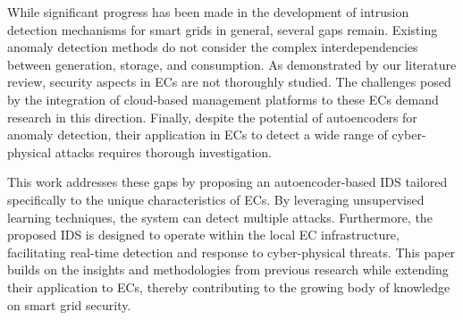 While significant progress has been made in the development of intrusion detection mechanisms for smart grids in general, several gaps remain. Existing anomaly detection methods do not consider the complex interdependencies between generation, storage, and consumption. As demonstrated by our literature review, security aspects in ECs are not thoroughly studied. The challenges posed by the integration of cloud-based management platforms to these ECs demand research in this direction. Finally, despite the potential of autoencoders for anomaly detection, their application in ECs to detect a wide range of cyber-physical attacks requires thorough investigation.

This work addresses these gaps by proposing an autoencoder-based IDS tailored specifically to the unique characteristics of ECs. By leveraging unsupervised learning techniques, the system can detect multiple attacks. Furthermore, the proposed IDS is designed to operate within the local EC infrastructure, facilitating real-time detection and response to cyber-physical threats. This paper builds on the insights and methodologies from previous research while extending their application to ECs, thereby contributing to the growing body of knowledge on smart grid security.